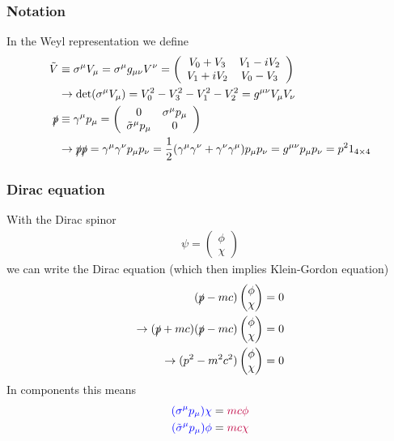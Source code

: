 \documentclass[10pt,a4paper]{report}
\theoremstyle{definition}
\begin{document}
\subsubsection{Notation}
In the Weyl representation we define
\begin{align}
\tilde{V}&\equiv\sigma^\mu V_\mu=\sigma^\mu g_{\mu\nu}V^\nu=\left(\begin{array}{cc}
V_0+V_3 & V_1-iV_2\\
V_1+iV_2 & V_0-V_3
\end{array}\right)\\
&\rightarrow\det(\sigma^\mu V_\mu)=V_0^2-V_3^2-V_1^2-V_2^2=g^{\mu\nu}V_\mu V_\nu \\
\slashed{p}&\equiv\gamma^\mu p_\mu
=\left(\begin{array}{cc}0 & \sigma^\mu p_\mu\\ \tilde{\sigma}^\mu p_\mu &0\end{array}\right)\\
&\rightarrow\slashed{p}\slashed{p}=\gamma^\mu\gamma^\nu p_\mu p_\nu=\frac{1}{2}(\gamma^\mu\gamma^\nu+\gamma^\nu\gamma^\mu)p_\mu p_\nu=g^{\mu\nu}p_\mu p_\nu=p^2 1_{4\times4}
\end{align}

\subsubsection{Dirac equation}
With the Dirac spinor
\begin{align}
\psi=\left(\begin{matrix}\phi\\ \chi\end{matrix}\right)
\end{align}
we can write the Dirac equation (which then implies Klein-Gordon equation)
\begin{align}
(\slashed{p}-mc)
\left(\begin{matrix}\phi\\ \chi\end{matrix}\right)=0\\
\rightarrow(\slashed{p}+mc)(\slashed{p}-mc)
\left(\begin{matrix}\phi\\ \chi\end{matrix}\right)=0\\
\rightarrow(p^2-m^2c^2)
\left(\begin{matrix}\phi\\ \chi\end{matrix}\right)=0
\end{align}
In components this means
\begin{align}
\textcolor{blue}{(\sigma^\mu p_\mu)\chi}
&=\textcolor{purple}{mc\phi}\\
\textcolor{blue}{(\tilde{\sigma}^\mu p_\mu)\phi}&=\textcolor{purple}{mc\chi}
\end{align}
\end{document}
